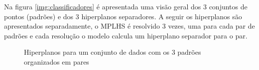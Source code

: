 Na figura \ref{img:classificadores} é apresentada uma visão geral dos 3 conjuntos de pontos (padrões) e dos 3 hiperplanos separadores. A seguir os hiperplanos são apresentados separadamente, o MPLHS é resolvido 3 vezes, uma para cada par de padrões e cada resolução o modelo calcula um hiperplano separador para o par.
\newpage 
\begin{figure}[!h]
\centering
{}
\qquad
{}
\qquad
{}
\label{img:class_separados}
\caption{Hiperplanos para um conjunto de dados com os 3 padrões organizados em pares}
\end{figure}

